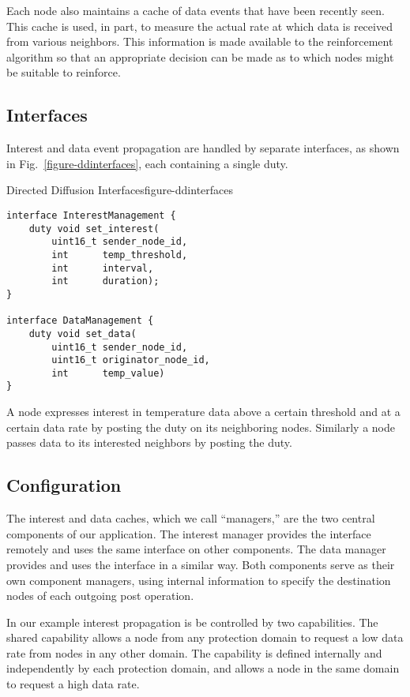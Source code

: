Each node also maintains a cache of data events that have been recently seen. This cache is
used, in part, to measure the actual rate at which data is received from various neighbors. This
information is made available to the reinforcement algorithm so that an appropriate decision can
be made as to which nodes might be suitable to reinforce.

\subsection{Interfaces}

Interest and data event propagation are handled by separate interfaces, as shown in
Fig.~\ref{figure-ddinterfaces}, each containing a single duty.
\begin{fpfig}[!t]{Directed Diffusion Interfaces}{figure-ddinterfaces}
{
\begin{Verbatim}
interface InterestManagement {
    duty void set_interest(
        uint16_t sender_node_id,
        int      temp_threshold,
        int      interval,
        int      duration);
}

interface DataManagement {
    duty void set_data(
        uint16_t sender_node_id,
        uint16_t originator_node_id,
        int      temp_value)
}
\end{Verbatim}
}
\end{fpfig}

A node expresses interest in temperature data above a certain threshold and at a certain data
rate by posting the  duty on its neighboring nodes. Similarly a node passes
data to its interested neighbors by posting the  duty.

\subsection{Configuration}

The interest and data caches, which we call ``managers,'' are the two central components of our
application. The interest manager provides the  interface remotely
and uses the same interface on other components. The data manager provides and uses the
 interface in a similar way. Both components serve as their own component
managers, using internal information to specify the destination nodes of each outgoing post
operation.

In our example interest propagation is be controlled by two capabilities. The shared
 capability allows a node from any protection domain to request a low data
rate from nodes in any other domain. The  capability is defined internally
and independently by each protection domain, and allows a node in the same domain to request a
high data rate.

